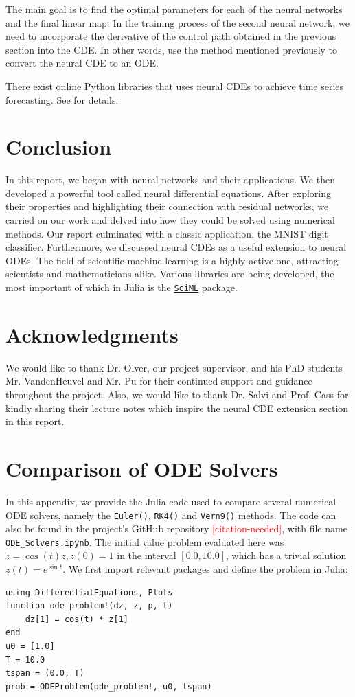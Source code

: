 \documentclass[a4paper,11pt,titlepage]{article}
\newcommand{\citationneeded}{\textcolor{red}{[citation-needed]}}
\theoremstyle{definition}
\theoremstyle{plain}
\theoremstyle{remark}
\begin{document}
The main goal is to find the optimal parameters for each of the neural networks and the final linear map. In the training process of the second neural network, we need to incorporate the derivative of the control path obtained in the previous section into the CDE. In other words, use the method mentioned previously to convert the neural CDE to an ODE.

There exist online Python libraries that uses neural CDEs to achieve time series forecasting. See \cite{Jhin2023} for details.

\pagebreak
\section{Conclusion}

In this report, we began with neural networks and their applications. We then developed a powerful tool called neural differential equations. After exploring their properties and highlighting their connection with residual networks, we carried on our work and delved into how they could be solved using numerical methods. Our report culminated with a classic application, the MNIST digit classifier. Furthermore, we discussed neural CDEs as a useful extension to neural ODEs. The field of scientific machine learning is a highly active one, attracting scientists and mathematicians alike. Various libraries are being developed, the most important of which in Julia is the \href{https://sciml.ai/}{\texttt{SciML}} package.

\section*{Acknowledgments}

We would like to thank Dr. Olver, our project supervisor, and his PhD students Mr. VandenHeuvel and Mr. Pu for their continued support and guidance throughout the project. Also, we would like to thank Dr. Salvi and Prof. Cass for kindly sharing their lecture notes which inspire the neural CDE extension section in this report.

\pagebreak
\appendix
\section{Comparison of ODE Solvers}
\label{sec:odesolvecode}

In this appendix, we provide the Julia code used to compare several numerical ODE solvers, namely the \texttt{Euler()}, \texttt{RK4()} and \texttt{Vern9()} methods. The code can also be found in the project's GitHub repository \citationneeded, with file name \texttt{ODE\_Solvers.ipynb}. The initial value problem evaluated here was $\dot{z} = \cos(t)z, z(0) = 1$ in the interval $[0.0, 10.0]$, which has a trivial solution $z(t) = e^{\sin t}$. We first import relevant packages and define the problem in Julia:
\begin{verbatim}
using DifferentialEquations, Plots
function ode_problem!(dz, z, p, t)
    dz[1] = cos(t) * z[1]
end
u0 = [1.0]
T = 10.0
tspan = (0.0, T)
prob = ODEProblem(ode_problem!, u0, tspan)
\end{verbatim}
\end{document}
